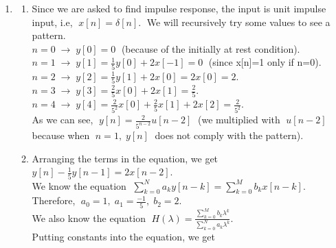 \documentclass[10pt,a4paper, margin=1in]{article}
\begin{document}
\begin{enumerate}
\item %
	\begin{enumerate}   
    \item %
    Since we are asked to find impulse response, the input is unit impulse input, i.e, $\; x[n] = \delta[n]. \;$ We will recursively try some values to see a pattern.\vspace{0.3cm}\\
    $n=0 \; \rightarrow \; y[0] = 0 \;$ (because of the initially at rest condition).\vspace{0.3cm}\\
    $n=1 \; \rightarrow \; y[1] = \frac{1}{5}y[0] + 2x[-1] = 0 \;$ (since x[n]=1 only if n=0).\vspace{0.3cm}\\
    $n=2 \; \rightarrow \; y[2] = \frac{1}{5}y[1] + 2x[0] = 2x[0] = 2.$\vspace{0.3cm}\\
    $n=3 \; \rightarrow \; y[3] = \frac{2}{5}x[0] + 2x[1] = \frac{2}{5}.$\vspace{0.3cm}\\
    $n=4 \; \rightarrow \; y[4] = \frac{2}{5^2}x[0] + \frac{2}{5}x[1] + 2x[2] = \frac{2}{5^2}.$\vspace{0.3cm}\\
    As we can see, $\; y[n] = \frac{2}{5^{n-2}}u[n-2] \;$ (we multiplied with $\; u[n-2] \;$ because when $\; n=1, \; y[n] \;$ does not comply with the pattern).\vspace{0.3cm}\\
    \item %
    Arranging the terms in the equation, we get\vspace{0.3cm}\\
    $y[n] - \frac{1}{5}y[n-1] = 2x[n-2].$\vspace{0.3cm}\\
    We know the equation $\; \sum_{k=0}^N a_ky[n-k] = \sum_{k=0}^M b_kx[n-k].$\vspace{0.3cm}\\
    Therefore, $\; a_0 = 1, \; a_1 = \frac{-1}{5}, \; b_2 = 2.$\vspace{0.3cm}\\
    We also know the equation $\; H(\lambda) = \frac{\sum_{k=0}^M b_k\lambda^k}{\sum_{k=0}^N a_k\lambda^k}.$\vspace{0.3cm}\\
    Putting constants into the equation, we get\vspace{0.3cm}\\

\end{enumerate}
\end{enumerate}
\end{document}
